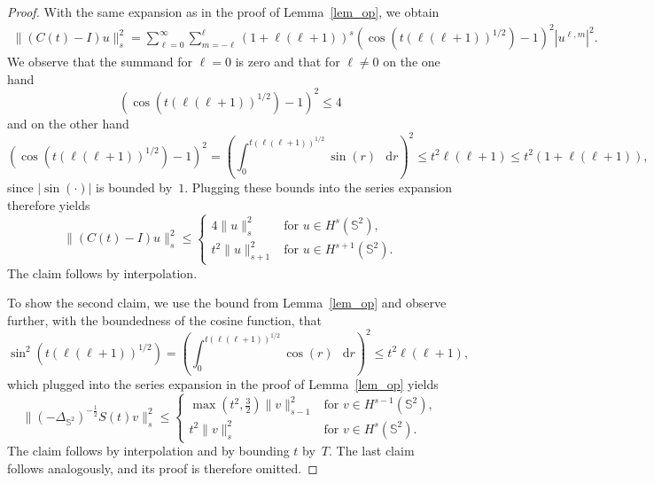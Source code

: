 \documentclass[10pt,a4paper]{amsart}
\newcommand*\dd{\mathop{}\!\mathrm{d}}
\newcommand{\IS}{\mathbb{S}}
\begin{document}
\begin{proof}
    With the same expansion as in the proof of Lemma~\ref{lem_op}, we obtain
    \begin{align*}
        \| (C(t) - I)u \|_s^2
            = \sum_{\ell=0}^\infty \sum_{m=-\ell}^\ell (1+\ell(\ell+1))^{s} (\cos(t(\ell(\ell+1))^{1/2}) - 1)^2 |u^{\ell,m}|^2.
    \end{align*}
    We observe that the summand for $\ell=0$ is zero and that for $\ell \neq 0$ on the one hand 
    \begin{equation*}
        (\cos(t(\ell(\ell+1))^{1/2}) - 1)^2 \le 4
    \end{equation*}
    and on the other hand 
    \begin{equation*}
        (\cos(t(\ell(\ell+1))^{1/2}) - 1)^2
            = \left( \int_0^{t(\ell(\ell+1))^{1/2}} \sin(r) \, \dd r \right)^2
            \le t^2 \ell(\ell+1)
            \le t^2 (1+\ell(\ell+1)),
    \end{equation*}
    since $|\sin(\cdot)|$ is bounded by~$1$. Plugging these bounds into the series expansion therefore yields
    \begin{equation*}
        \| (C(t) - I)u \|_s^2
        \le
        \begin{cases}
            4 \|u\|_s^2 & \text{for } u \in H^s(\IS^2),\\
            t^2 \|u\|_{s+1}^2 & \text{for } u \in H^{s+1}(\IS^2).
        \end{cases}
    \end{equation*}
    The claim follows by interpolation.

    To show the second claim, we use the bound from Lemma~\ref{lem_op} and observe further, with the boundedness of the cosine function, that
    \begin{equation*}
        \sin^2(t(\ell(\ell+1))^{1/2})
            = \left( \int_0^{t(\ell(\ell+1))^{1/2}} \cos(r) \, \dd r\right)^2
            \le t^2 \ell(\ell+1),
    \end{equation*}
    which plugged into the series expansion in the proof of Lemma~\ref{lem_op} yields
    \begin{equation*}
        \| (-\Delta_{\mathbb{S}^2})^{-\frac{1}{2}} S(t)v \|_s^2
        \le
        \begin{cases}
            \max\left(t^2,\tfrac{3}{2}\right) \|v\|_{s-1}^2 & \text{for } v \in H^{s-1}(\IS^2),\\
            t^2 \|v\|_{s}^2 & \text{for } v \in H^{s}(\IS^2).
        \end{cases}
    \end{equation*}
    The claim follows by interpolation and by bounding $t$ by~$T$.
    The last claim follows analogously, and its proof is therefore omitted.
\end{proof}
\end{document}
